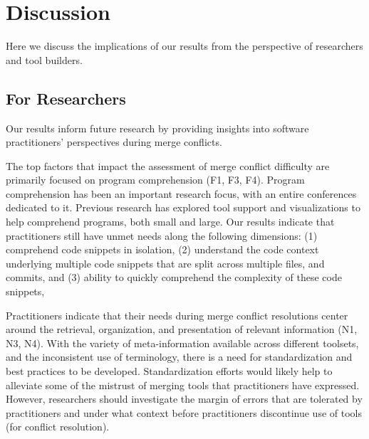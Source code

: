 \section{Discussion}\label{implications}
Here we discuss the implications of our results from the perspective of researchers and tool builders.

\subsection{For Researchers}
Our results inform future research by providing insights into software practitioners' perspectives during merge conflicts.

The top factors that impact the assessment of merge conflict difficulty are primarily focused on program comprehension (F1, F3, F4).
Program comprehension has been an important research focus, with an entire conferences dedicated to it.
Previous research has explored tool support and visualizations to help comprehend programs, both small and large.
Our results indicate that practitioners still have unmet needs along the following dimensions: (1) comprehend code snippets in isolation, (2) understand the code context underlying multiple code snippets that are split across multiple files, and commits, and (3) ability to quickly comprehend the complexity of these code snippets, 


Practitioners indicate that their needs during merge conflict resolutions center around the retrieval, organization, and presentation of relevant information (N1, N3, N4).
With the variety of meta-information available across different toolsets, and the inconsistent use of terminology, there is a need for standardization and best practices to be developed.
Standardization efforts would likely help to alleviate some of the mistrust of merging tools that practitioners have expressed.
However, researchers should investigate the margin of errors that are tolerated by practitioners and under what context before practitioners discontinue use of tools (for conflict resolution).

